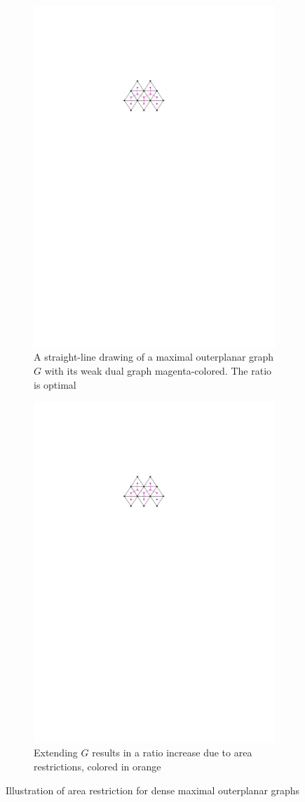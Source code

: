 	\begin{figure}[H]
	\centering
	\begin{subfigure}{0.5\textwidth}
		\centering
		\includegraphics[page=1,width=0.7\linewidth]{graphics/maximal_outerplanar_extension_ratio.pdf}
		\caption{A straight-line drawing of a maximal outerplanar graph $G$ with its weak dual graph magenta-colored. The ratio is optimal}
	\end{subfigure}
	\begin{subfigure}{0.5\textwidth}
		\centering
		\includegraphics[page=2,width=0.7\linewidth]{graphics/maximal_outerplanar_extension_ratio.pdf}
		\caption{Extending $G$ results in a ratio increase due to area restrictions, colored in orange}
	\end{subfigure}
	\caption{Illustration of area restriction for dense maximal outerplanar graphs}
\end{figure}
